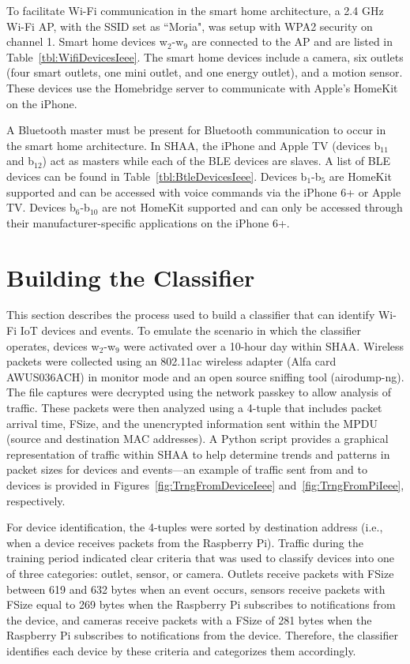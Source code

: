 \documentclass[journal]{./IEEEtran/IEEEtran}
\begin{document}
To facilitate Wi-Fi communication in the smart home architecture, a 2.4 GHz Wi-Fi \ac{AP}, with the \ac{SSID} set as ``Moria", was setup with \ac{WPA2} security on channel 1. Smart home devices w$ _2 $-w$ _9 $ are connected to the \ac{AP} and are listed in Table~\ref{tbl:WifiDevicesIeee}. The smart home devices include a camera, six outlets (four smart outlets, one mini outlet, and one energy outlet), and a motion sensor. These devices use the Homebridge server to communicate with Apple's HomeKit on the iPhone. 

A Bluetooth master must be present for Bluetooth communication to occur in the smart home architecture. In \ac{SHAA}, the iPhone and Apple TV (devices b$_{11}$ and b$_{12}$) act as masters while each of the \ac{BLE} devices are slaves. A list of \ac{BLE} devices can be found in Table~\ref{tbl:BtleDevicesIeee}. Devices b$ _1 $-b$ _5$ are HomeKit supported and can be accessed with voice commands via the iPhone 6+ or Apple TV. Devices b$ _6$-b$ _{10} $ are not HomeKit supported and can only be accessed through their manufacturer-specific applications on the iPhone 6+.

\section{Building the Classifier}\label{classifier}

This section describes the process used to build a classifier that can identify Wi-Fi \ac{IoT} devices and events. To emulate the scenario in which the classifier operates, devices w$_2$-w$_9$ were activated over a 10-hour day within \ac{SHAA}.  Wireless packets were collected using an 802.11ac wireless adapter (Alfa card AWUS036ACH) in monitor mode and an open source sniffing tool (airodump-ng). The file captures were decrypted using the network passkey to allow analysis of traffic. These packets were then analyzed using a 4-tuple that includes packet arrival time, \ac{FSize}, and the unencrypted information sent within the \ac{MPDU} (source and destination \ac{MAC} addresses). A Python script provides a graphical representation of traffic within \ac{SHAA} to help determine trends and patterns in packet sizes for devices and events---an example of traffic sent from and to devices is provided in Figures~\ref{fig:TrngFromDeviceIeee} and~\ref{fig:TrngFromPiIeee}, respectively.

\tableWifiDevicesIeee
\tableBtleDevicesIeee

For device identification, the 4-tuples were sorted by destination address (i.e., when a device receives packets from the Raspberry Pi). Traffic during the training period indicated clear criteria that was used to classify devices into one of three categories: outlet, sensor, or camera. Outlets receive packets with \ac{FSize} between 619 and 632 bytes when an event occurs, sensors receive packets with \ac{FSize} equal to 269 bytes when the Raspberry Pi subscribes to notifications from the device, and cameras receive packets with a \ac{FSize} of 281 bytes when the Raspberry Pi subscribes to notifications from the device. Therefore, the classifier identifies each device by these criteria and categorizes them accordingly.
\end{document}
